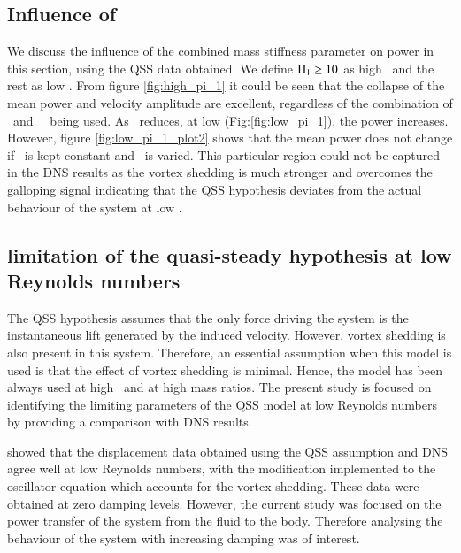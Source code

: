  \subsection{Influence of \ \massstiff}
 
 
 
 
 
 
We discuss the influence of the combined mass stiffness parameter on power in this section, using the QSS data obtained. We define $\Pi_1 \geq 10$ as high \massstiff \ and the rest as low \massstiff. From figure \ref{fig:high_pi_1} it could be seen that the collapse of the mean power and velocity amplitude are excellent, regardless of the combination of \ustar \ and \ \mstar \ being used. As \massstiff \ reduces, at low \massstiff (Fig:\ref{fig:low_pi_1}), the power increases. However, figure \ref{fig:low_pi_1_plot2} shows that the mean power does not change if \massstiff \ is kept constant and \mstar \ is varied. This particular region could not be captured in the DNS results as the vortex shedding is much stronger and overcomes the galloping signal indicating that the QSS hypothesis deviates from the actual behaviour of the system at low \massstiff.
 
 
\subsection{limitation of the quasi-steady hypothesis at low Reynolds numbers}



The QSS hypothesis assumes that the only force driving the system is the instantaneous lift generated by the induced velocity. However, vortex shedding is also present in this system. Therefore, an essential assumption when this model is used is that the effect of vortex shedding is minimal. Hence, the model has been always used at high \reynoldsnumber \ and  at high mass ratios. The present study is focused on identifying the limiting parameters of the QSS model at low Reynolds numbers by providing a comparison with DNS results. 


\citet{Joly2012} showed that the displacement data obtained using the QSS assumption and DNS agree well at low Reynolds numbers, with the modification implemented to the oscillator equation which accounts for the vortex shedding. These data were obtained at zero damping levels. However, the current study was focused on the power transfer of the system from the fluid to the body. Therefore analysing the behaviour of the system with increasing damping was of interest.

